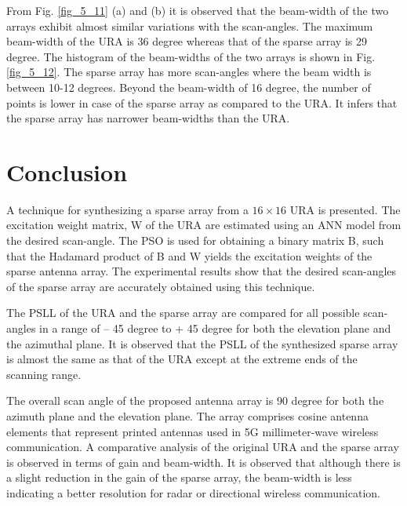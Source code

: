 From Fig. \ref{fig_5_11} (a) and (b) it is observed that the beam-width of the two arrays exhibit almost similar variations with the scan-angles. The maximum beam-width of the URA is 36 degree whereas that of the sparse array is 29 degree. The histogram of the beam-widths of the two arrays is shown in Fig. \ref{fig_5_12}. The sparse array has more scan-angles where the beam width is between 10-12 degrees. Beyond the beam-width of 16 degree, the number of points is lower in case of the sparse array as compared to the URA. It infers that the sparse array has narrower beam-widths than the URA.

\section{Conclusion} \label{c5sec_cncl}
A technique for synthesizing a sparse array from a $16\times 16$ URA is presented. The excitation weight matrix, W of the URA are estimated using an ANN model from the desired scan-angle. The PSO is used for obtaining a binary matrix B, such that the Hadamard product of B and W yields the excitation weights of the sparse antenna array. The experimental results show that the desired scan-angles of the sparse array are accurately obtained using this technique.

The PSLL of the URA and the sparse array are compared for all possible scan-angles in a range of -- 45 degree to + 45 degree for both the elevation plane and the azimuthal plane. It is observed that the PSLL of the synthesized sparse array is almost the same as that of the URA except at the extreme ends of the scanning range.

The overall scan angle of the proposed antenna array is 90 degree for both the azimuth plane and the elevation plane. The array comprises cosine antenna elements that represent printed antennas used in 5G millimeter-wave wireless communication. A comparative analysis of the original URA and the sparse array is observed in terms of gain and beam-width. It is observed that although there is a slight reduction in the gain of the sparse array, the beam-width is less indicating a better resolution for radar or directional wireless communication.
